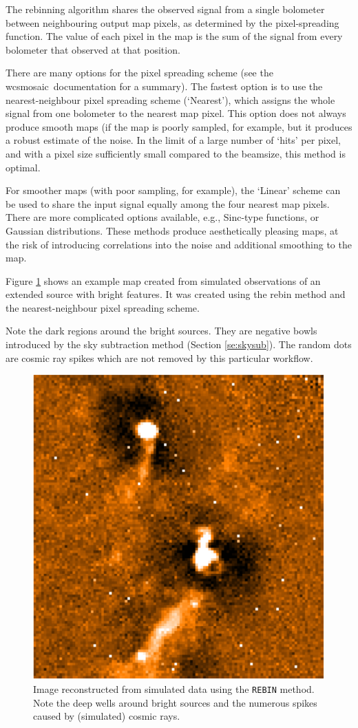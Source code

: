 \documentclass[twoside,11pt]{article}
\newcommand{\xref}[3]{#1}
\renewcommand{\_}{\texttt{\symbol{95}}}
\newcommand{\task}[1]{\textsf{#1}}
\newcommand{\wcsmosaic}{\xref{\task{wcsmosaic}}{sun95}{WCSMOSAIC}}
\newcommand{\aparam}[1]{\texttt{#1}}     %
\begin{document}
The rebinning algorithm shares the observed signal from a single
bolometer between neighbouring output map pixels, as determined by the
pixel-spreading function. The value of each pixel in the map is the
sum of the signal from every bolometer that observed at that position.

There are many options for the pixel spreading scheme (see the \wcsmosaic\
documentation for a summary). The fastest option is to use the nearest-neighbour
pixel spreading scheme (`Nearest'), which assigns the whole signal
from one bolometer to the nearest map pixel. This option does not
always produce smooth maps (if the map is poorly sampled, for example,
but it produces a robust estimate of the noise. In the limit of a
large number of `hits' per pixel, and with a pixel size sufficiently
small compared to the beamsize, this method is optimal.

For smoother maps (with poor sampling, for example), the `Linear'
scheme can be used to share the input signal equally among the four
nearest map pixels. There are more complicated options available,
e.g., Sinc-type functions, or Gaussian distributions. These methods
produce aesthetically pleasing maps, at the risk of introducing
correlations into the noise and additional smoothing to the map.

Figure \ref{fig:rebinmap} shows an example map created from simulated
observations of an extended source with bright features. It was
created using the rebin method and the nearest-neighbour pixel
spreading scheme.

Note the dark regions around the bright sources. They are negative
bowls introduced by the sky subtraction method (Section
\ref{se:skysub}). The random dots are cosmic ray spikes which are not
removed by this particular workflow.

\begin{figure}[htb]
  \begin{center}
    \includegraphics[width=0.7\linewidth]{sun258_rebinmap}
    \caption{Image reconstructed from simulated data using the
      \aparam{REBIN} method. Note the deep wells around bright
      sources and the numerous spikes caused by (simulated) cosmic
      rays.}
    \label{fig:rebinmap}
  \end{center}
\end{figure}
\end{document}
